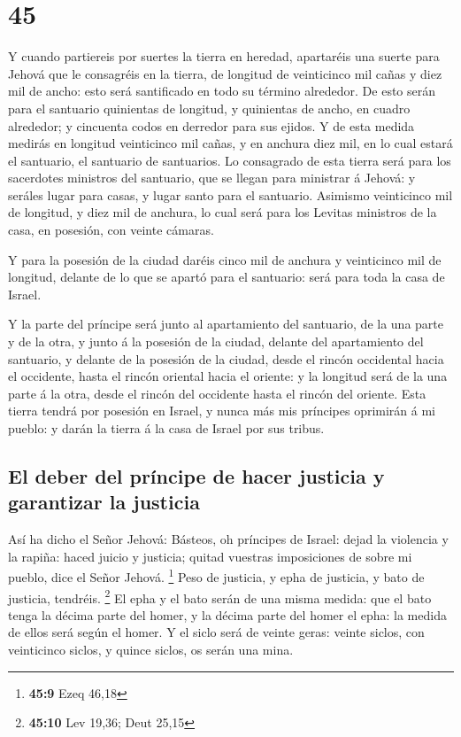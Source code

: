 \hypertarget{section-44}{%
\section{45}\label{section-44}}

 Y cuando partiereis por suertes la tierra en heredad,
apartaréis una suerte para Jehová que le consagréis en la tierra, de
longitud de veinticinco mil cañas y diez mil de ancho: esto será
santificado en todo su término alrededor.  De esto serán
para el santuario quinientas de longitud, y quinientas de ancho, en
cuadro alrededor; y cincuenta codos en derredor para sus ejidos.
 Y de esta medida medirás en longitud veinticinco mil cañas,
y en anchura diez mil, en lo cual estará el santuario, el santuario de
santuarios.  Lo consagrado de esta tierra será para los
sacerdotes ministros del santuario, que se llegan para ministrar á
Jehová: y seráles lugar para casas, y lugar santo para el santuario.
 Asimismo veinticinco mil de longitud, y diez mil de
anchura, lo cual será para los Levitas ministros de la casa, en
posesión, con veinte cámaras.

 Y para la posesión de la ciudad daréis cinco mil de anchura
y veinticinco mil de longitud, delante de lo que se apartó para el
santuario: será para toda la casa de Israel.

 Y la parte del príncipe será junto al apartamiento del
santuario, de la una parte y de la otra, y junto á la posesión de la
ciudad, delante del apartamiento del santuario, y delante de la posesión
de la ciudad, desde el rincón occidental hacia el occidente, hasta el
rincón oriental hacia el oriente: y la longitud será de la una parte á
la otra, desde el rincón del occidente hasta el rincón del oriente.
 Esta tierra tendrá por posesión en Israel, y nunca más mis
príncipes oprimirán á mi pueblo: y darán la tierra á la casa de Israel
por sus tribus.

\hypertarget{el-deber-del-pruxedncipe-de-hacer-justicia-y-garantizar-la-justicia}{%
\subsection{El deber del príncipe de hacer justicia y garantizar la
justicia}\label{el-deber-del-pruxedncipe-de-hacer-justicia-y-garantizar-la-justicia}}

 Así ha dicho el Señor Jehová: Básteos, oh príncipes de
Israel: dejad la violencia y la rapiña: haced juicio y justicia; quitad
vuestras imposiciones de sobre mi pueblo, dice el Señor Jehová.
\footnote{\textbf{45:9} Ezeq 46,18}  Peso de justicia, y
epha de justicia, y bato de justicia, tendréis. \footnote{\textbf{45:10}
  Lev 19,36; Deut 25,15}  El epha y el bato serán de una
misma medida: que el bato tenga la décima parte del homer, y la décima
parte del homer el epha: la medida de ellos será según el homer.
 Y el siclo será de veinte geras: veinte siclos, con
veinticinco siclos, y quince siclos, os serán una mina.

